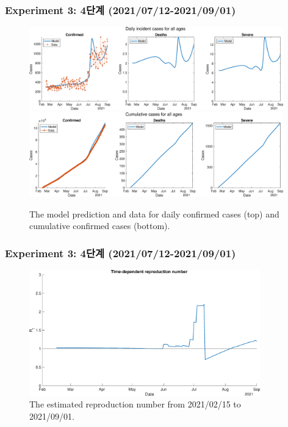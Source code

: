 \documentclass[aspectratio=169, 9pt, xcolor=dvipsnames]{beamer}
\begin{document}
	\begin{frame}\frametitle{Experiment 3: 4단계 (2021/07/12-2021/09/01)}
	    \begin{figure}
	    	\centering
	    	\includegraphics[width=11cm]{../results/estimate_sd_2nd_3/daily_all_age.eps}
	    	\includegraphics[width=11cm]{../results/estimate_sd_2nd_3/cumul_all_age.eps}
	    	\caption{The model prediction and data for daily confirmed cases (top) and cumulative confirmed cases (bottom).}
	    \end{figure}
	\end{frame}

	\begin{frame}\frametitle{Experiment 3: 4단계 (2021/07/12-2021/09/01)}
	    \begin{figure}
	    	\centering
	    	\includegraphics[width=10cm]{../results/estimate_sd_2nd_3/rep_num.eps}
	    	\caption{The estimated reproduction number from 2021/02/15 to 2021/09/01.}
	    \end{figure}
	\end{frame}
\end{document}
